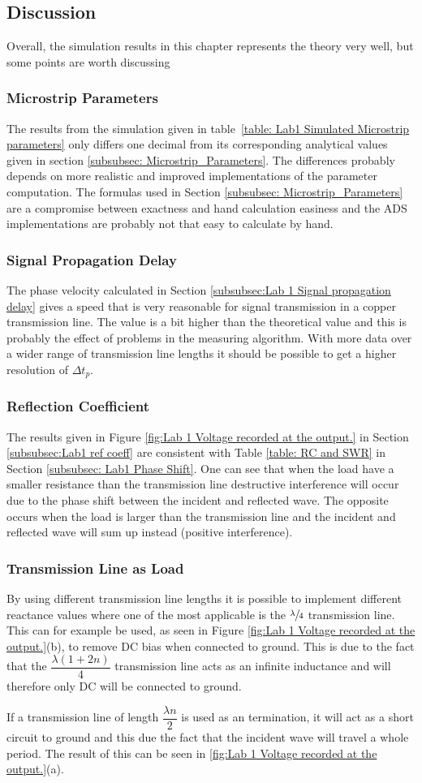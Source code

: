 \documentclass[report.tex]{subfiles}
\begin{document}
\subsection{Discussion}
Overall, the simulation results in this chapter represents the theory very well, but some points are worth discussing
\subsubsection{Microstrip Parameters}
The results from the simulation given in table~\ref{table: Lab1 Simulated Microstrip parameters} only differs one decimal from its corresponding analytical values given in section \ref{subsubsec: Microstrip_Parameters}. The differences probably depends on more realistic and improved implementations of the parameter computation. The formulas used in Section \ref{subsubsec: Microstrip_Parameters} are a compromise between exactness and hand calculation easiness and the ADS implementations are probably not that easy to calculate by hand.
\subsubsection{Signal Propagation Delay}
The phase velocity calculated in Section \ref{subsubsec:Lab 1 Signal propagation delay} gives a speed that is very reasonable for signal transmission in a copper transmission line. The value is a bit higher than the theoretical value and this is probably the effect of problems in the measuring algorithm. With more data over a wider range of transmission line lengths it should be possible to get a higher resolution of $\Delta t_p$.
\subsubsection{Reflection Coefficient}
The results given in Figure \ref{fig:Lab 1 Voltage recorded at the output.} in Section \ref{subsubsec:Lab1 ref coeff} are consistent with Table \ref{table: RC and SWR} in Section \ref{subsubsec: Lab1 Phase Shift}. One can see that when the load have a smaller resistance than the transmission line destructive interference will occur due to the phase shift between the incident and reflected wave. The opposite occurs when the load is larger than the transmission line and the incident and reflected wave will sum up instead (positive interference).
\subsubsection{Transmission Line as Load}
By using different transmission line lengths it is possible to implement different reactance values where one of the most applicable is the $\sfrac{\lambda}{4}$ transmission line. This can for example be used, as seen in Figure \ref{fig:Lab 1 Voltage recorded at the output.}(b), to remove DC bias when connected to ground. This is due to the fact that the  $\dfrac{\lambda \left( 1 + 2n \right)}{4}$ transmission line acts as an infinite inductance and will therefore only DC will be connected to ground.

If a transmission line of length $\dfrac{\lambda n}{2}$ is used as an termination, it will act as a short circuit to ground and this due the fact that the incident wave will travel a whole period. The result of this can be seen in \ref{fig:Lab 1 Voltage recorded at the output.}(a).
\end{document}
